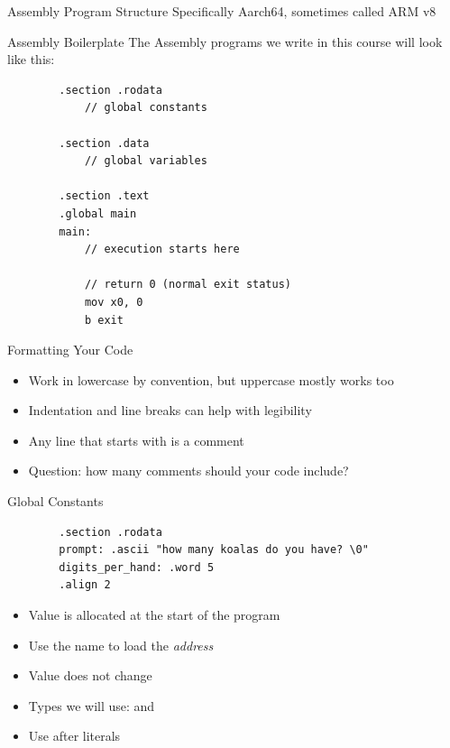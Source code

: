 
\begin{frame}{Assembly Program Structure}
	Specifically Aarch64, sometimes called ARM v8
\end{frame}

\begin{frame}[fragile]{Assembly Boilerplate}
	The Assembly programs we write in this course will look like this:
	\begin{verbatim}
		.section .rodata
			// global constants
		
		.section .data
			// global variables
		
		.section .text
		.global main
		main:
			// execution starts here

			// return 0 (normal exit status)
			mov x0, 0
			b exit
	\end{verbatim}
\end{frame}

\begin{frame}{Formatting Your Code}
	\begin{itemize}
		\item Work in lowercase by convention, but uppercase mostly works too
		\item Indentation and line breaks can help with legibility
		\item Any line that starts with \Arm{//} is a comment
		\item Question: how many comments should your code include?
	\end{itemize}
\end{frame}



\begin{frame}[fragile]{Global Constants}
	\begin{verbatim}
		.section .rodata
		prompt: .ascii "how many koalas do you have? \0"
		digits_per_hand: .word 5
		.align 2
		\end{verbatim}
	\begin{itemize}
		\item Value is allocated at the start of the program
		\item Use the name to load the \emph{address}
		\item Value does not change
		\item Types we will use:  and 
		\item Use  after  literals
	\end{itemize}
\end{frame}

